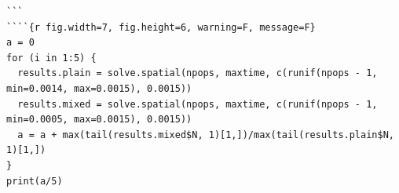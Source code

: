 \documentclass[a4paper,12pt]{article}
\newenvironment{code}{\fontfamily{cmtt}\selectfont}{\par}
\begin{document}
\begin{code}
\begin{lstlisting}[frame=single]
```
````{r fig.width=7, fig.height=6, warning=F, message=F}
a = 0
for (i in 1:5) {
  results.plain = solve.spatial(npops, maxtime, c(runif(npops - 1, min=0.0014, max=0.0015), 0.0015))
  results.mixed = solve.spatial(npops, maxtime, c(runif(npops - 1, min=0.0005, max=0.0015), 0.0015))
  a = a + max(tail(results.mixed$N, 1)[1,])/max(tail(results.plain$N, 1)[1,])
}
print(a/5)
\end{lstlisting}

\end{code}


\newpage
\singlespacing
\let\itshape\upshape     %


\end{document}
